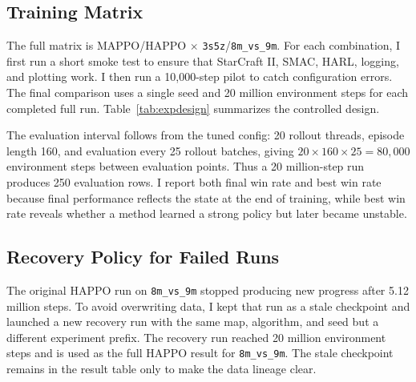 \documentclass{article}
\begin{document}
\subsection{Training Matrix}

The full matrix is MAPPO/HAPPO \(\times\) \texttt{3s5z}/\texttt{8m\_vs\_9m}. For each combination, I first run a short smoke test to ensure that StarCraft II, SMAC, HARL, logging, and plotting work. I then run a 10,000-step pilot to catch configuration errors. The final comparison uses a single seed and 20 million environment steps for each completed full run. Table~\ref{tab:expdesign} summarizes the controlled design.

\begin{table}[h]
\centering
\caption{Full-run experimental design.}
\label{tab:expdesign}
\end{table}

The evaluation interval follows from the tuned config: 20 rollout threads, episode length 160, and evaluation every 25 rollout batches, giving \(20 \times 160 \times 25 = 80{,}000\) environment steps between evaluation points. Thus a 20 million-step run produces 250 evaluation rows. I report both final win rate and best win rate because final performance reflects the state at the end of training, while best win rate reveals whether a method learned a strong policy but later became unstable.

\subsection{Recovery Policy for Failed Runs}

The original HAPPO run on \texttt{8m\_vs\_9m} stopped producing new progress after 5.12 million steps. To avoid overwriting data, I kept that run as a stale checkpoint and launched a new recovery run with the same map, algorithm, and seed but a different experiment prefix. The recovery run reached 20 million environment steps and is used as the full HAPPO result for \texttt{8m\_vs\_9m}. The stale checkpoint remains in the result table only to make the data lineage clear.
\end{document}
